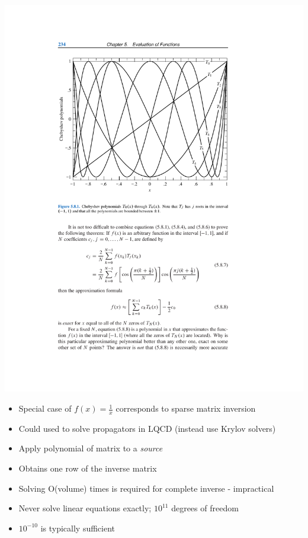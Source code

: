 \documentclass[pdf,ps,8pt]{beamer}
\begin{document}
\begin{frame}[fragile]
\begin{columns}
\begin{column}{0.5\textwidth}
        \includegraphics[width=\textwidth]{ChebyOrthog.pdf}
        \begin{itemize}
          \item Special case of $f(x) = \frac{1}{x}$ corresponds to sparse matrix inversion
          \item Could used to solve propagators in LQCD (instead use Krylov solvers)
          \item Apply polynomial of matrix to a \emph{source}
          \item Obtains one row of the inverse matrix
          \item Solving O(volume) times is required for complete inverse - impractical
          \item Never solve linear equations exactly; $10^{11}$ degrees of freedom
          \item $10^{-10}$ is typically sufficient
          \end{itemize}
      \end{column}
      \end{columns}
  \end{frame}
\end{document}
